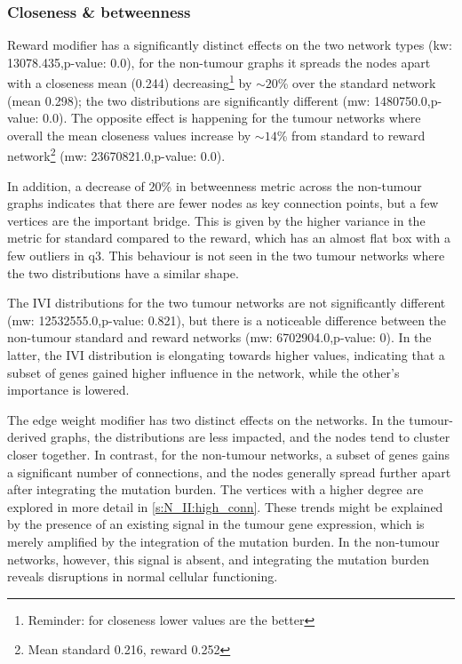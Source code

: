 \subsubsection*{Closeness \& betweenness}

Reward modifier has a significantly distinct effects on the two network types (\acrshort{kw}: 13078.435,p-value: 0.0), for the non-tumour graphs it spreads the nodes apart with a closeness mean (0.244) decreasing\footnote{Reminder: for closeness lower values are the better} by $\sim20$\% over the standard network (mean 0.298); the two distributions are significantly different (\acrshort{mw}: 1480750.0,p-value: 0.0). The opposite effect is happening for the tumour networks where overall the mean closeness values increase by $\sim14$\% from standard to reward network\footnote{Mean standard 0.216, reward 0.252} (\acrshort{mw}: 23670821.0,p-value: 0.0).

In addition, a decrease of $20$\% in betweenness metric across the non-tumour graphs indicates that there are fewer nodes as key connection points, but a few vertices are the important bridge. This is given by the higher variance in the metric for standard compared to the reward, which has an almost flat box with a few outliers in q3. This behaviour is not seen in the two tumour networks where the two distributions have a similar shape.

The IVI distributions for the two tumour networks are not significantly different (\acrshort{mw}: 12532555.0,p-value: 0.821), but there is a noticeable difference between the non-tumour standard and reward networks (\acrshort{mw}: 6702904.0,p-value: 0). In the latter, the IVI distribution is elongating towards higher values, indicating that a subset of genes gained higher influence in the network, while the other's importance is lowered.


The edge weight modifier has two distinct effects on the networks. In the tumour-derived graphs, the distributions are less impacted, and the nodes tend to cluster closer together. In contrast, for the non-tumour networks, a subset of genes gains a significant number of connections, and the nodes generally spread further apart after integrating the mutation burden. The vertices with a higher degree are explored in more detail in \cref{s:N_II:high_conn}. These trends might be explained by the presence of an existing signal in the tumour gene expression, which is merely amplified by the integration of the mutation burden. In the non-tumour networks, however, this signal is absent, and integrating the mutation burden reveals disruptions in normal cellular functioning.

